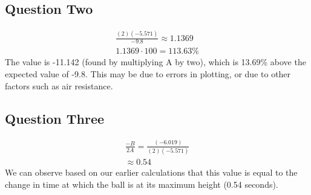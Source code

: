 \documentclass[10pt,twocolumn,letterpaper]{article}
\begin{document}
\subsection{Question Two}
\begin{align}
    \nonumber\frac{(2)(-5.571)}{-9.8}\approx 1.1369\\
\nonumber1.1369\cdot 100=113.63 \%
\end{align}
The value is -11.142 (found by multiplying A by two), which is 13.69\% above the expected value of -9.8. This may be due to errors in plotting, or due to other factors such as air resistance.
\subsection{Question Three}
\begin{align}
\nonumber\frac{-B}{2A}=\frac{(-6.019)}{(2)(-5.571)}\\
\nonumber\approx 0.54
\end{align}
We can observe based on our earlier calculations that this value is equal to the change in time at which the ball is at its maximum height (0.54 seconds).
\end{document}
